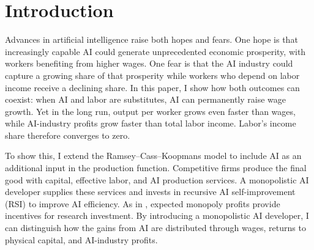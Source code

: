 \section{Introduction}
\label{sec:rewrite-introduction}

Advances in artificial intelligence raise both hopes and fears. One hope is that increasingly capable AI could generate unprecedented economic prosperity, with workers benefiting from higher wages. One fear is that the AI industry could capture a growing share of that prosperity while workers who depend on labor income receive a declining share. In this paper, I show how both outcomes can coexist: when AI and labor are substitutes, AI can permanently raise wage growth. Yet in the long run, output per worker grows even faster than wages, while AI-industry profits grow faster than total labor income. Labor’s income share therefore converges to zero.

To show this, I extend the Ramsey--Cass--Koopmans model to include AI as an additional input in the production function. Competitive firms produce the final good with capital, effective labor, and AI production services. A monopolistic AI developer supplies these services and invests in recursive AI self-improvement (RSI) to improve AI efficiency. As in \citet{romer1990}, expected monopoly profits provide incentives for research investment. %
By introducing a monopolistic AI developer, I can distinguish how the gains from AI are distributed through wages, returns to physical capital, and AI-industry profits. 




